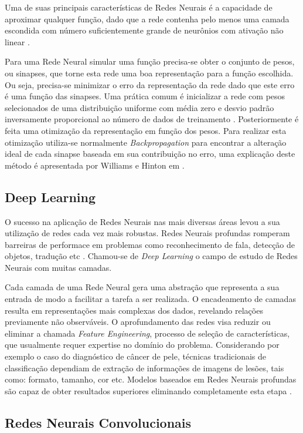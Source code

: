 Uma de suas principais características de Redes Neurais é a capacidade de aproximar qualquer função, dado que a rede contenha pelo menos uma camada escondida com número suficientemente grande de neurônios com ativação não linear \cite{hornik89}.

Para uma Rede Neural simular uma função precisa-se obter o conjunto de pesos, ou sinapses, que torne esta rede uma boa representação para a função escolhida. Ou seja, precisa-se minimizar o erro da representação da rede dado que este erro é uma função das sinapses. Uma prática comum é inicializar a rede com pesos selecionados de uma distribuição uniforme com média zero e desvio padrão inversamente proporcional ao número de dados de treinamento \cite{lecun12}. Posteriormente é feita uma otimização da representação em função dos pesos. Para realizar esta otimização utiliza-se normalmente \textit{Backpropagation} para encontrar a alteração ideal de cada sinapse baseada em sua contribuição no erro, uma explicação deste método é apresentada por Williams e Hinton em \cite{williams86}.

\subsection{Deep Learning}

O sucesso na aplicação de Redes Neurais nas mais diversas áreas levou a sua utilização de redes cada vez mais robustas. Redes Neurais profundas romperam barreiras de performace em problemas como reconhecimento de fala, detecção de objetos, tradução etc \cite{lecun15}. Chamou-se de \textit{Deep Learning} o campo de estudo de Redes Neurais com muitas camadas.

Cada camada de uma Rede Neural gera uma abstração que representa a sua entrada de modo a facilitar a tarefa a ser realizada. O encadeamento de camadas resulta em representações mais complexas dos dados, revelando relações previamente não observáveis. O aprofundamento das redes visa reduzir ou eliminar a chamada \textit{Feature Engineering}, processo de seleção de características, que usualmente requer expertise no domínio do problema. Considerando por exemplo o caso do diagnóstico de câncer de pele, técnicas tradicionais de classificação dependiam de extração de informações de imagens de lesões, tais como: formato, tamanho, cor etc. Modelos baseados em Redes Neurais profundas são capaz de obter resultados superiores eliminando completamente esta etapa \cite{esteva17}.

\subsection{Redes Neurais Convolucionais} \label{sec:convolucionais}


